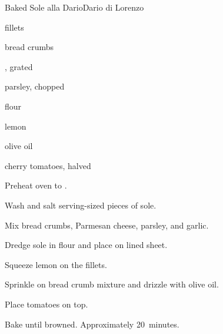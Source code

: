 \begin{recipe}{Baked Sole alla Dario}{Dario di Lorenzo}{}

\begin{ingredients}
\item {} fillets
\item bread crumbs
\item {}, grated
\item parsley, chopped
\item flour
\item lemon
\item olive oil
\item cherry tomatoes, halved
\end{ingredients}

\begin{directions}
\item Preheat oven to .
\item Wash and salt serving-sized pieces of sole.
\item Mix bread crumbs, Parmesan cheese, parsley, and garlic.
\item Dredge sole in flour and place on lined sheet.
\item Squeeze lemon on the fillets.
\item Sprinkle on bread crumb mixture and drizzle with olive oil.
\item Place tomatoes on top.
\item Bake until browned. Approximately 20~minutes.
\end{directions}

\end{recipe}
